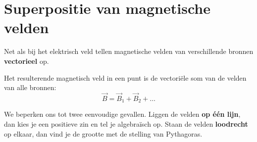 \documentclass{ximera}
\begin{document}
\section{Superpositie van magnetische velden}\label{sec:superpositie-B}
Net als bij het elektrisch veld tellen magnetische velden van verschillende bronnen \textbf{vectorieel} op.

\begin{proposition}[foldable=true,title={Superpositiebeginsel}]\nl
    Het resulterende magnetisch veld in een punt is de vectoriële som van de velden van alle bronnen:
    \begin{equation*}
        \vec{B} = \vec{B}_1 + \vec{B}_2 + \dots
    \end{equation*}
\end{proposition}

We beperken ons tot twee eenvoudige gevallen. Liggen de velden \textbf{op één lijn}, dan kies je een positieve zin en tel je algebraïsch op. Staan de velden \textbf{loodrecht} op elkaar, dan vind je de grootte met de stelling van Pythagoras.
\end{document}
